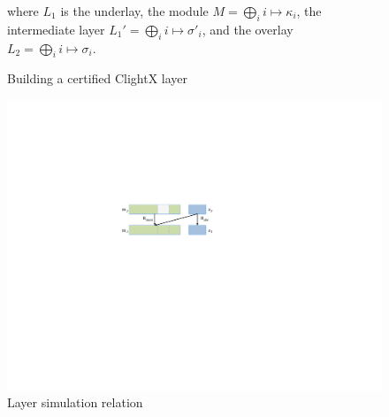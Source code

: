 \begin{figure}\small
    \begin{prooftree}
    \end{prooftree}
    where $L_1$ is the underlay, the module $M = \bigoplus_i i \mapsto \kappa_i$, the intermediate layer $L_1' = \bigoplus_i i \mapsto \sigma'_i$, and the overlay $L_2 = \bigoplus_i i \mapsto \sigma_i$.
    \caption{Building a certified ClightX layer}
    \label{fig:lprooftree}
\end{figure}

\begin{figure}
\begin{center}
\includegraphics[scale=.7]{figs/layersimulation}
\caption{Layer simulation relation}
\label{fig:layersimulation}
\end{center}
\end{figure}

